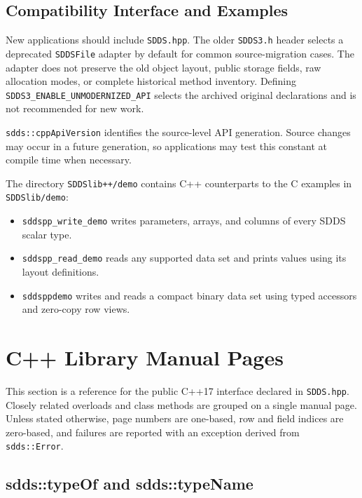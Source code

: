 \documentclass[11pt]{article}
\begin{document}
\subsection{Compatibility Interface and Examples}

New applications should include \verb|SDDS.hpp|.  The older
\verb|SDDS3.h| header selects a deprecated {\tt SDDSFile} adapter by default for
common source-migration cases.  The adapter does not preserve the old object
layout, public storage fields, raw allocation modes, or complete historical
method inventory.  Defining {\tt SDDS3\_ENABLE\_UNMODERNIZED\_API} selects the
archived original declarations and is not recommended for new work.

{\tt sdds::cppApiVersion} identifies the source-level API generation.  Source
changes may occur in a future generation, so applications may test this
constant at compile time when necessary.

The directory \verb|SDDSlib++/demo| contains C++ counterparts to the C examples
in \verb|SDDSlib/demo|:

\begin{itemize}
\item {\tt sddspp\_write\_demo} writes parameters, arrays, and columns of every
SDDS scalar type.
\item {\tt sddspp\_read\_demo} reads any supported data set and prints values
using its layout definitions.
\item {\tt sddsppdemo} writes and reads a compact binary data set using typed
accessors and zero-copy row views.
\end{itemize}

\section{C++ Library Manual Pages}
\label{CppManualPages}

This section is a reference for the public C++17 interface declared in
\verb|SDDS.hpp|.  Closely related overloads and class methods are grouped on a
single manual page.  Unless stated otherwise, page numbers are one-based, row
and field indices are zero-based, and failures are reported with an exception
derived from {\tt sdds::Error}.

\subsection{sdds::typeOf and sdds::typeName}
\label{CppTypeInspection}
\end{document}
